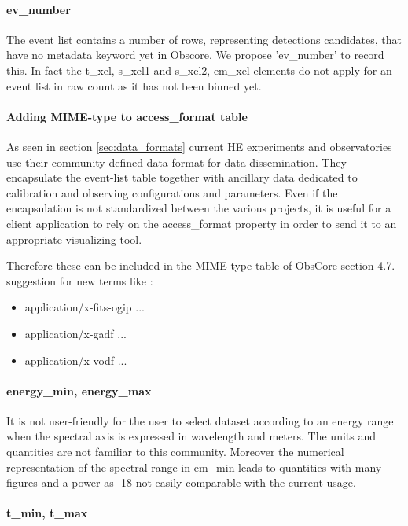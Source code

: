\documentclass[11pt,a4paper]{ivoa}
\begin{document}
\paragraph{ev\_number}
The event list contains a number of rows, representing detections candidates, that have no metadata keyword yet in Obscore.
We propose 'ev\_number' to record this.
In fact the t\_xel, s\_xel1 and s\_xel2, em\_xel elements do not apply for an event list in raw count
as it has not been binned yet.

\paragraph{Adding MIME-type to access\_format table}
As seen in section \ref{sec:data_formats} current HE experiments and observatories
use their community defined data format for data dissemination.
They encapsulate the event-list table together with ancillary data dedicated
to calibration and observing configurations and parameters.
Even if the encapsulation is not standardized between the various projects,
it is useful for a client application to rely on the access\_format property in
order to send it to an appropriate visualizing tool.

Therefore these can be included in the MIME-type table of ObsCore section 4.7.
suggestion for new terms like :
\begin{itemize}
\item application/x-fits-ogip ...
\item application/x-gadf  ...
\item application/x-vodf  ...
\end{itemize}

\paragraph{energy\_min, energy\_max}
It is not user-friendly for the user to select dataset according to an energy range
when the spectral axis is expressed in wavelength and meters. The units and quantities are not familiar to this community.
Moreover the numerical representation of the spectral range in em\_min leads to quantities with many figures and a power as -18 not easily comparable with the current usage.




\paragraph{t\_min, t\_max}
\end{document}
